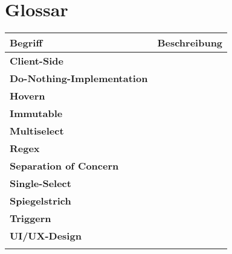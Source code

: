 \chapter{Glossar}
\label{chap:glossary}

\begin{table}[!ht]
    \label{table:Glossary}
    \footnotesize
    \begin{adjustbox}{max width=\textwidth}
        \begin{threeparttable}
            \begin{tabular}{ l | l }
                \bf{Begriff} & \bf{Beschreibung} \\
                \hline \hline
                \bf{Client-Side} &  \\
                \hline
                \bf{Do-Nothing-Implementation} &  \\
                \hline
                \bf{Hovern} &  \\
                \hline
                \bf{Immutable} &  \\
                \hline
                \bf{Multiselect} &  \\
                \hline
                \bf{Regex} &  \\
                \hline
                \bf{Separation of Concern} &  \\
                \hline
                \bf{Single-Select} &  \\
                \hline
                \bf{Spiegelstrich} &  \\
                \hline
                \bf{Triggern} &  \\
                \hline
                \bf{UI/UX-Design} &  \\
                \hline
                \bf{} &  \\
            \end{tabular}
        \end{threeparttable}
    \end{adjustbox}
\end{table}
